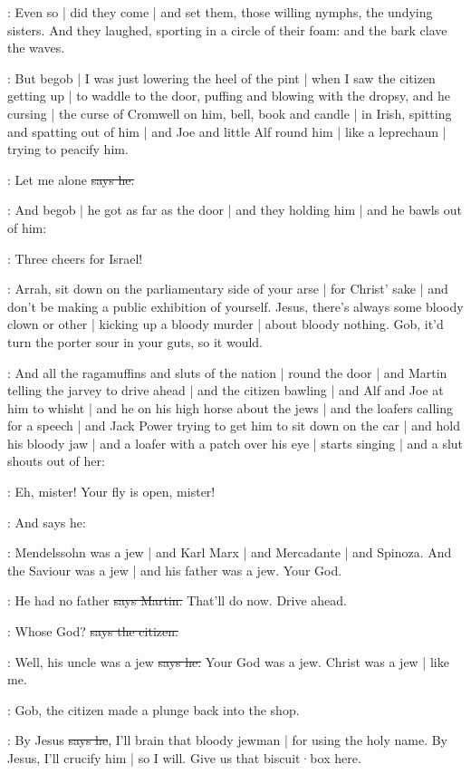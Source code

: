 :
Even so |
did they come |
and set them,
those willing nymphs,
the undying sisters.
And they laughed,
sporting in a circle of their foam:
and the bark clave the waves.

\Nq:
But begob |
I was just lowering the heel of the pint |
when I saw the citizen getting up |
to waddle to the door,
puffing and blowing with the dropsy,
and he cursing |
the curse of Cromwell on him,
bell, book and candle |
in Irish,
spitting and spatting out of him |
and Joe and little Alf round him |
like a leprechaun |
trying to peacify him.

\citizen:
Let me alone
\sout{says he.}

\Nq:
And begob |
he got as far as the door |
and they holding him |
and he bawls out of him:%

\citizen:
Three cheers for Israel!

\Nq:
Arrah,
sit down on the parliamentary side of your arse |
for Christ' sake |
and don't be making a public exhibition of yourself.
Jesus,
there's always some bloody clown or other |
kicking up a bloody murder |
about bloody nothing.
Gob,
it'd turn the porter sour in your guts,
so it would.

\Nq:
And all the ragamuffins and sluts of the nation |
round the door |
and Martin telling the jarvey to drive ahead |
and the citizen bawling |
and Alf and Joe at him to whisht |
and he on his high horse about the jews |
and the loafers calling for a speech |
and Jack Power trying to get him to sit down on the car |
and hold his bloody jaw
 |
and a loafer with a patch over his eye |
starts singing  |
and a slut shouts out of her:

\ragamuffin:
Eh,
mister!
Your fly is open,
mister!

\Nq:
And says he:

\Bloom:
Mendelssohn was a jew |
and Karl Marx |
and Mercadante |
and Spinoza.
And the Saviour was a jew |
and his father was a jew.
Your God.

\cunningham:
He had no father
\sout{says Martin.}
That'll do now.
Drive ahead.

\citizen:
Whose God?
\sout{says the citizen.}

\Bloom:
Well,
his uncle was a jew
\sout{says he.}
Your God was a jew.
Christ was a jew |
like me.

\Nq:
Gob,
the citizen made a plunge back into the shop.

\citizen:
By Jesus
\sout{says he},
I'll brain that bloody jewman |
for using the holy name.
By Jesus,
I'll crucify him |
so I will.
Give us that biscuit·box here.

